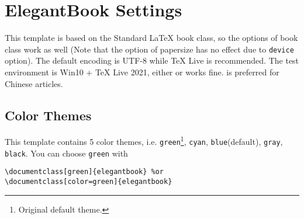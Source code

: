\chapter{ElegantBook Settings}

This template is based on the Standard \LaTeX{} book class, so the options of book class work as well (Note that the option of papersize has no effect due to \lstinline{device} option). The default encoding is UTF-8 while \TeX{} Live is recommended. The test environment is Win10 + \TeX{} Live 2021, either  or  works fine.  is preferred for Chinese articles.


\section{Color Themes}
This template contains 5 color themes, i.e. \textcolor{structure1}{\lstinline{green}}\footnote{Original default theme.}, \textcolor{structure2}{\lstinline{cyan}}, \textcolor{structure3}{\lstinline{blue}}(default), \textcolor{structure4}{\lstinline{gray}}, \textcolor{structure5}{\lstinline{black}}. You can choose \lstinline{green} with
\begin{lstlisting}
\documentclass[green]{elegantbook} %or
\documentclass[color=green]{elegantbook}
\end{lstlisting}


